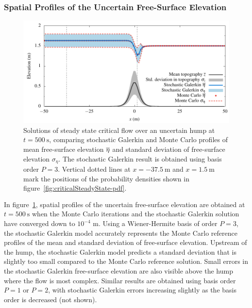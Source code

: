 \subsubsection{Spatial Profiles of the Uncertain Free-Surface Elevation}

\begin{figure}
    \centering
    \includegraphics{fig-criticalSteadyState-flow.pdf}
    \caption{Solutions of steady state critical flow over an uncertain hump at $t = \SI{500}{\second}$, comparing stochastic Galerkin and Monte Carlo profiles of mean free-surface elevation $\overline{\eta}$ and standard deviation of free-surface elevation $\sigma_\eta$.
    The stochastic Galerkin result is obtained using basis order $P = 3$.
    Vertical dotted lines at $x = \SI{-37.5}{\meter}$ and $x = \SI{1.5}{\meter}$ mark the positions of the probability densities shown in figure~\ref{fig:criticalSteadyState-pdf}.
    }
    \label{fig:criticalSteadyState-flow}
\end{figure}

In figure~\ref{fig:criticalSteadyState-flow}, spatial profiles of the uncertain free-surface elevation are obtained at $t = \SI{500}{\second}$ when the Monte Carlo iterations and the stochastic Galerkin solution have converged down to $10^{-4}$ \si{\meter}.
Using a Wiener-Hermite basis of order $P=3$, the stochastic Galerkin model accurately represents the Monte Carlo reference profiles of the mean and standard deviation of free-surface elevation.
Upstream of the hump, the stochastic Galerkin model predicts a standard deviation that is slightly too small compared to the Monte Carlo reference solution.
Small errors in the stochastic Galerkin free-surface elevation are also visible above the hump where the flow is most complex.
Similar results are obtained using basis order $P=1$ or $P=2$, with stochastic Galerkin errors increasing slightly as the basis order is decreased (not shown).

